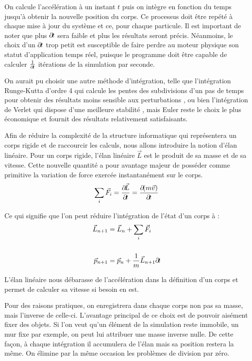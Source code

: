 On calcule l'accélération à un instant $t$ puis on intègre en fonction
du temps jusqu'à obtenir la nouvelle position du corps. Ce processus
doit être repété à chaque mise à jour du système et ce, pour chaque
particule. Il est important de noter que plus $\partial \! t$ sera faible
et plus les résultats seront précis. Néanmoins, le choix d'un $\partial \!
t$ trop petit est susceptible de faire perdre au moteur physique son
statut d'application temps réel, puisque le programme doit être
capable de calculer $\frac{1}{\partial \! t}$ itérations de la simulation
par seconde.

On aurait pu choisir une autre méthode d'intégration, telle que
l'intégration Runge-Kutta d'ordre 4 qui calcule les pentes des
subdivisions d'un pas de temps pour obtenir des résultats moins
sensible aux perturbations \cite{fiedler}, ou bien l'intégration de
Verlet qui dispose d'une meilleure stabilité \cite{bitterli}, mais
Euler reste le choix le plus économique et fournit des résultats
relativement satisfaisants.

Afin de réduire la complexité de la structure informatique qui
représentera un corps rigide et de raccourcir les calculs, nous allons
introduire la notion d'élan linéaire. Pour un corps rigide, l'élan
linéaire $\vec{L}$ est le produit de sa masse et de sa vitesse. Cette
nouvelle quantité a pour avantage majeur de posséder comme primitive
la variation de force exercée instantanément sur le corps.
\begin{align*}
  {\sum_i \vec{F}_i} = \frac{\partial \! \vec{L}}{\partial \! t} = \frac{\partial \! (m\vec{v})}{\partial \! t}
\end{align*}

Ce qui signifie que l'on peut réduire l'intégration de l'état d'un
corps à :
\begin{align*}
  \vec{L}_{n+1} &= \vec{L}_n + {\sum_i \vec{F}_i} \\ \\
  \vec{p}_{n+1} &= \vec{p}_n + \frac{1}{m}\vec{L}_{n+1} \partial \! t
\end{align*}

L'élan linéaire nous débarasse de l'accélération dans la définition
d'un corps et permet de calculer sa vitesse si besoin en est.

Pour des raisons pratiques, on enregistrera dans chaque corps non pas
sa masse, mais l'inverse de celle-ci. L'avantage principal de ce choix
est de pouvoir aisément fixer des objets. Si l'on veut qu'un élément
de la simulation reste immobile, un mur fixe par exemple, on peut lui
attribuer une masse inverse nulle. De cette façon, à chaque
intégration il accumulera de l'élan mais sa position restera la
même. On élimine par la même occasion les problèmes de division par
zéro.

